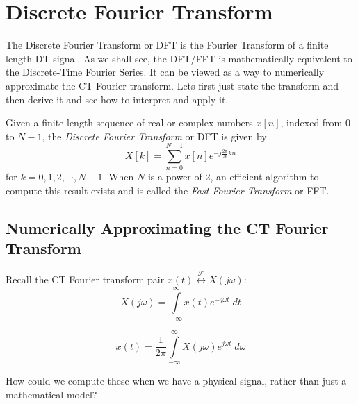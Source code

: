 \section{Discrete Fourier Transform}

The Discrete Fourier Transform or DFT is the Fourier Transform of a finite length DT signal. As we shall see, the DFT/FFT is mathematically equivalent to the Discrete-Time Fourier Series. It can be viewed as a way to numerically approximate the CT Fourier transform. Lets first just state the transform and then derive it and see how to interpret and apply it.

Given a finite-length sequence of real or complex numbers $x[n]$, indexed from $0$ to $N-1$, the \emph{Discrete Fourier Transform} or DFT is given by
\[
X[k] = \sum_{n = 0}^{N-1}  x[n] e^{-j \frac{2\pi}{N}k n}
\]
for $k = 0, 1, 2, \cdots, N-1$. When $N$ is a power of 2, an efficient algorithm to compute this result exists and is called the \emph{Fast Fourier Transform} or FFT.

\subsection{Numerically Approximating the CT Fourier Transform}

Recall the CT Fourier transform pair $x(t) \stackrel{\mathcal{F}}{\longleftrightarrow} X(j\omega)$:
\[
X(j\omega) = \int\limits_{-\infty}^{\infty} x(t) e^{-j\omega t} \; dt
\]

\[
x(t) = \frac{1}{2\pi} \int\limits_{-\infty}^{\infty} X(j\omega) e^{j\omega t} \; d\omega
\]

How could we compute these when we have a physical signal, rather than just a mathematical model?

